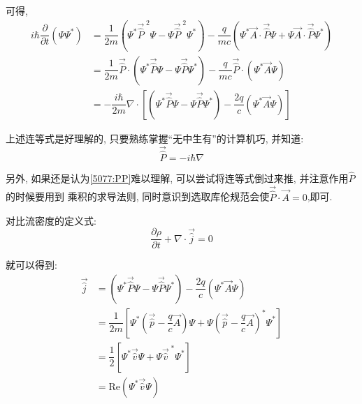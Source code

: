 \documentclass[a4paper, 11pt]{article}
\begin{document}
\begin{spacing}{1.2}
        可得,
        \begin{equation}
          \label{5077:PP}
          \begin{aligned}
            i\hbar\dfrac{\partial}{\partial{}t}\left(\Psi\Psi^*\right) 
            &= \dfrac{1}{2m}\left(\Psi^*\vec{\hat{P}}^{\;2}\Psi-\Psi\vec{\hat{P}}^{\;2}\Psi^*\right)-
            \dfrac{q}{mc}\left(\Psi^*\vec{A}\cdot\vec{\hat{P}}\Psi+\Psi\vec{A}\cdot\vec{\hat{P}}\Psi^*\right)\\
            &= \dfrac{1}{2m}\vec{\hat{P}}\cdot\left(\Psi^*\vec{\hat{P}}\Psi-\Psi\vec{\hat{P}}\Psi^*\right)-
            \dfrac{q}{mc}\vec{\hat{P}}\cdot\left(\Psi^*\vec{A}\Psi\right)\\
            &= -\dfrac{i\hbar}{2m}\nabla\cdot\left[\left(\Psi^*\vec{\hat{P}}\Psi-
            \Psi\vec{\hat{P}}\Psi^*\right)-\dfrac{2q}{c}\left(\Psi^*\vec{A}\Psi\right)\right]
          \end{aligned}
        \end{equation}

        上述连等式是好理解的, 只要熟练掌握``无中生有''的计算机巧, 并知道:
        \begin{equation}
          \vec{\hat{P}} = -i\hbar\nabla
        \end{equation}

        另外, 如果还是认为\eqref{5077:PP}难以理解, 可以尝试将连等式倒过来推, 并注意作用$\hat{P}$的时候要用到
        乘积的求导法则, 同时意识到选取库伦规范会使$\vec{\hat{P}}\cdot\vec{A}=0$,即可.

        

        对比流密度的定义式:
        \begin{equation}
          \dfrac{\partial{}\rho}{\partial{}t}+\nabla\cdot\vec{\hat{j}} = 0
        \end{equation}

        就可以得到:
        \begin{equation}
          \begin{aligned}
            \vec{\hat{j}} &= \left(\Psi^*\vec{\hat{P}}\Psi-
            \Psi\vec{\hat{P}}\Psi^*\right)-\dfrac{2q}{c}\left(\Psi^*\vec{A}\Psi\right)\\
            &=\dfrac{1}{2m}\left[\Psi^*\left(\vec{\hat{p}}-\dfrac{q}{c}\vec{A}\right)\Psi+
            \Psi\left(\vec{\hat{p}}-\dfrac{q}{c}\vec{A}\right)^*\Psi^*\right]\\
            &=\dfrac{1}{2}\left[\Psi^*\vec{\hat{v}}\Psi+\Psi{\vec{\hat{v}}}^{\;*}\Psi^*\right]\\
            &= \mathrm{Re}\left(\Psi^*\vec{\hat{v}}\Psi\right)
          \end{aligned}
        \end{equation}
    

\end{spacing}
\end{document}
